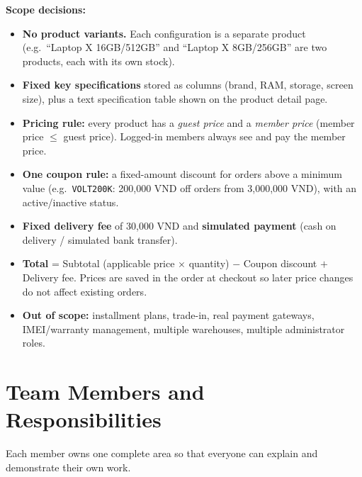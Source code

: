 \documentclass[12pt,a4paper]{article}
\begin{document}
\textbf{Scope decisions:}
\begin{itemize}
  \item \textbf{No product variants.} Each configuration is a separate product
        (e.g.\ ``Laptop X 16GB/512GB'' and ``Laptop X 8GB/256GB'' are two products,
        each with its own stock).
  \item \textbf{Fixed key specifications} stored as columns (brand, RAM, storage, screen size),
        plus a text specification table shown on the product detail page.
  \item \textbf{Pricing rule:} every product has a \emph{guest price} and a \emph{member price}
        (member price $\le$ guest price). Logged-in members always see and pay the member price.
  \item \textbf{One coupon rule:} a fixed-amount discount for orders above a minimum value
        (e.g.\ \texttt{VOLT200K}: 200{,}000 VND off orders from 3{,}000{,}000 VND), with an active/inactive status.
  \item \textbf{Fixed delivery fee} of 30{,}000 VND and \textbf{simulated payment}
        (cash on delivery / simulated bank transfer).
  \item \textbf{Total} = Subtotal (applicable price $\times$ quantity) $-$ Coupon discount $+$ Delivery fee.
        Prices are saved in the order at checkout so later price changes do not affect existing orders.
  \item \textbf{Out of scope:} installment plans, trade-in, real payment gateways, IMEI/warranty
        management, multiple warehouses, multiple administrator roles.
\end{itemize}

\section{Team Members and Responsibilities}

Each member owns one complete area so that everyone can explain and demonstrate their own work.
\end{document}
